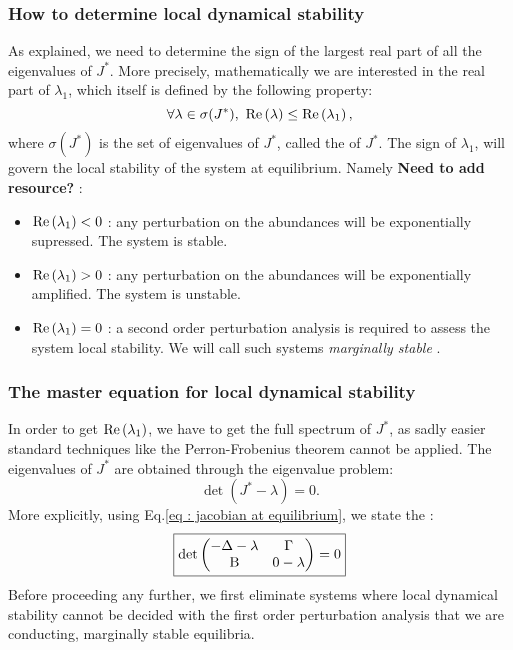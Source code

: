 \documentclass[12pt, titlepage]{report}
\begin{document}
\subsubsection{How to determine local dynamical stability}
As explained, we need to determine the sign of the largest real part of all the eigenvalues of $J^*$.
More precisely, mathematically we are interested in the real part of $\lambda_1$, which itself is defined by the following property:
\begin{equation}
\forall \lambda \in \sigma(J^*), \ \text{Re}\left(\lambda\right) \leq \text{Re}\left(\lambda_1\right),
\end{equation}
where $\sigma(J^*)$ is the set of eigenvalues of $J^*$, called the  of $J^*$.
The sign of $\lambda_1$, will govern the local stability of the system at equilibrium. Namely \textbf{Need to add resource?} :
\begin{itemize}
\item $\text{Re}\left(\lambda_1\right) < 0$ : any perturbation on the abundances will be exponentially supressed. The system is stable.
\item $\text{Re}\left(\lambda_1\right) > 0$ : any perturbation on the abundances will be exponentially amplified. The system is unstable.
\item $\text{Re}\left(\lambda_1\right)=0$ : a second order perturbation analysis is required to assess the system local stability. We will call such systems \textit{marginally stable} \cite{biroli_marginally_2018}.
\end{itemize}

\subsubsection{The master equation for local dynamical stability}
In order to get $\text{Re}\left(\lambda_1\right)$, we have to get the full spectrum of $J^*$, as sadly easier standard techniques like the Perron-Frobenius theorem \cite{perron_zur_nodate} cannot be applied. The eigenvalues of $J^*$ are obtained through the eigenvalue problem:
\begin{equation}
\det\left(J^* - \lambda \right) = 0.
\end{equation}
More explicitly, using Eq.\eqref{eq : jacobian at equilibrium}, we state the  :
\begin{equation}
\boxed{
\det
\begin{pmatrix}
 -\Delta - \lambda  & \Gamma \\
 \text{B} & 0-\lambda
\end{pmatrix} = 0
}\label{eq : master equation eigenvalues jacobian}
\end{equation}
Before proceeding any further, we first eliminate systems where local dynamical stability cannot be decided with the first order perturbation analysis that we are conducting, \ie marginally stable equilibria.
\end{document}
